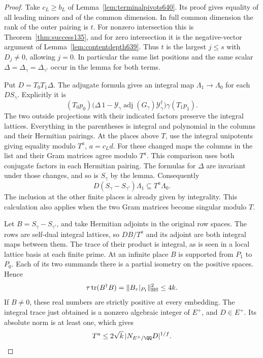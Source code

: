 \documentclass[a4paper,11pt]{article}
\theoremstyle{definition}
\theoremstyle{remark}
\numberwithin{equation}{section}
\begin{document}
\begin{proof}
Take \(c_L\ge b_L\) of Lemma~\ref{lem:terminalpivots640}. Its
proof gives equality of all leading minors and of the common
dimension. In full common dimension the rank of the outer
pairing is \(t\). For nonzero intersection this is
Theorem~\ref{thm:success135}, and for zero intersection it is
the negative-vector argument of Lemma~\ref{lem:contentdepth639}.
Thus \(t\) is the largest \(j\le s\) with \(D_j\ne0\), allowing
\(j=0\). In particular the same list positions and the same
scalar \(\Delta=\Delta_\gamma=\Delta_{\gamma'}\) occur in
the lemma for both terms.

Put \(D=T_0T_1\Delta\). The adjugate formula gives an integral
map \(\Lambda_1\to\Lambda_0\) for each \(D S_\gamma\). Explicitly
it is
\[
  (T_0p_0)\bigl(\Delta\,1-
     \mathcal Y_\gamma\operatorname{adj}(G_\gamma)
                           \mathcal Y_\gamma^\dagger\bigr)
                                      \gamma(T_1p_1).
\]
The two outside projections with their indicated factors
preserve the integral lattices. Everything in the parentheses
is integral and polynomial in the columns and their Hermitian
pairings. At the places above \(T\), use the integral
unipotents giving equality modulo \(T^a\), \(a=c_Ld\).
For these changed maps the columns in the list and their Gram
matrices agree modulo \(T^a\). This comparison uses both
conjugate factors in each Hermitian pairing. The formulas for
\(\Delta\) are invariant under those changes, and so is
\(S_\gamma\) by the lemma. Consequently
\[
      D(S_\gamma-S_{\gamma'})\Lambda_1\subseteq T^a\Lambda_0 .
\]
The inclusion at the other finite places is already given by
integrality. This calculation also applies when the two Gram
matrices become singular modulo \(T\).

Let \(B=S_\gamma-S_{\gamma'}\), and take Hermitian adjoints
in the original row spaces. The rows are self-dual integral
lattices, so \(D B/T^a\) and its adjoint are both integral
maps between them. The trace of their product is integral,
as is seen in a local lattice basis at each finite prime.
At an infinite place \(B\) is supported from \(P_1\) to
\(P_0\). Each of its two summands there is a partial isometry
on the positive spaces. Hence
\[
          \tau\operatorname{tr}(B^\dagger B)
                     =\|B_\tau|_{P_1}\|_{\rm HS}^2\le4k .
\]
If \(B\ne0\), these real numbers are strictly positive at every
embedding. The integral trace just obtained is a nonzero
algebraic integer of \(E^+\), and \(D\in E^+\). Its absolute
norm is at least one, which gives
\[
                    T^a\le 2\sqrt{k}\,
                            |N_{E^+/\QQ}D|^{1/f}.
\]


\end{proof}
\end{document}
